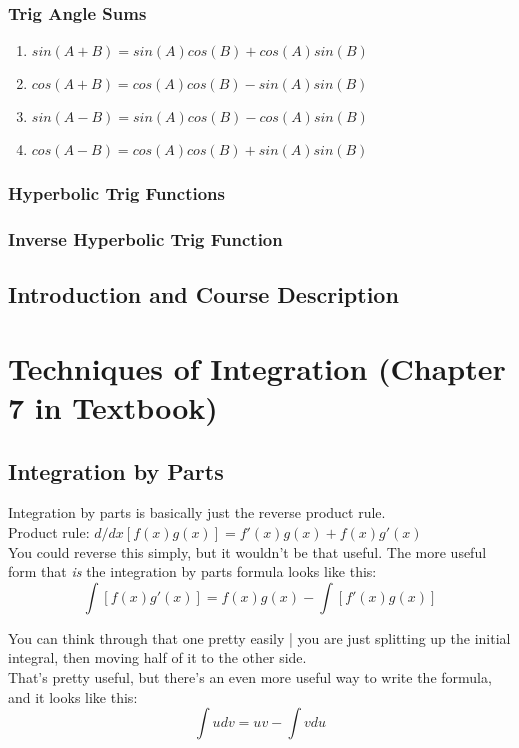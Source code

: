 \documentclass[a4paper,12pt]{report}
\begin{document}
\subsection{Trig Angle Sums}
\begin{enumerate}
\item $sin(A+B) = sin(A)cos(B) + cos(A)sin(B)$
\item $cos(A+B) = cos(A)cos(B) - sin(A)sin(B)$
\item $sin(A-B) = sin(A)cos(B) - cos(A)sin(B)$
\item $cos(A-B) = cos(A)cos(B) + sin(A)sin(B)$
\end{enumerate}

\subsection{Hyperbolic Trig Functions}
\subsection{Inverse Hyperbolic Trig Function}

\section{Introduction and Course Description}
\chapter{Techniques of Integration (Chapter 7 in Textbook)}
\section{Integration by Parts}

Integration by parts is basically just the reverse product rule.\\

Product rule: $d/dx [f(x)g(x)] = f'(x)g(x) + f(x)g'(x)$\\

You could reverse this simply, but it wouldn't be that useful. The more useful form that \textit{is} the integration by parts formula looks like this: $$\int [f(x)g'(x)] = f(x)g(x) - \int [f'(x)g(x)]$$

You can think through that one pretty easily | you are just splitting up the initial integral, then moving half of it to the other side.\\

That's pretty useful, but there's an even more useful way to write the formula, and it looks like this: $$\int u dv = uv - \int v du$$
\end{document}

